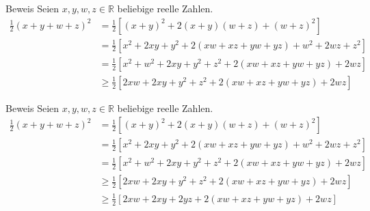 \documentclass[10pt]{beamer}
\def\bR{\mathbb{R}}
\begin{document}
\begin{frame}{Beweis}
    Seien \( x, y, w, z \in \bR \) beliebige reelle Zahlen.
    \begin{align*}
        \frac{1}{2} \left( x + y + w + z \right)^{2}
        & = \frac{1}{2} \left[ \left( x + y \right)^{2} + 2 \left( x + y \right)\left( w + z \right) + \left( w + z \right)^{2} \right] \\
        & = \frac{1}{2} \left[ x^{2} + 2xy + y^{2} + 2 \left( xw + xz + yw + yz \right) + w^{2} + 2wz + z^{2} \right] \\
        & = \frac{1}{2} \left[ x^{2} + w^{2} + 2xy + y^{2} + z^{2} + 2 \left( xw + xz + yw + yz \right)  + 2wz \right] \\
        & \geq \frac{1}{2} \left[ 2xw + 2xy + y^{2} + z^{2} + 2 \left( xw + xz + yw + yz \right)  + 2wz \right]
    \end{align*}
\end{frame}



\begin{frame}{Beweis}
    Seien \( x, y, w, z \in \bR \) beliebige reelle Zahlen.
    \begin{align*}
        \frac{1}{2} \left( x + y + w + z \right)^{2}
        & = \frac{1}{2} \left[ \left( x + y \right)^{2} + 2 \left( x + y \right)\left( w + z \right) + \left( w + z \right)^{2} \right] \\
        & = \frac{1}{2} \left[ x^{2} + 2xy + y^{2} + 2 \left( xw + xz + yw + yz \right) + w^{2} + 2wz + z^{2} \right] \\
        & = \frac{1}{2} \left[ x^{2} + w^{2} + 2xy + y^{2} + z^{2} + 2 \left( xw + xz + yw + yz \right)  + 2wz \right] \\
        & \geq \frac{1}{2} \left[ 2xw + 2xy + y^{2} + z^{2} + 2 \left( xw + xz + yw + yz \right)  + 2wz \right] \\
        & \geq \frac{1}{2} \left[ 2xw + 2xy + 2yz + 2 \left( xw + xz + yw + yz \right)  + 2wz \right]
    \end{align*}
\end{frame}
\end{document}
